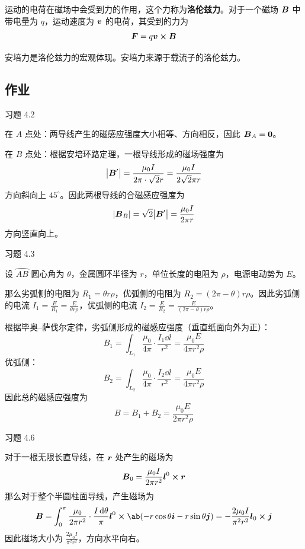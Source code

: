 \begin{definition}[洛伦兹力]
	运动的电荷在磁场中会受到力的作用，这个力称为\textbf{洛伦兹力}。对于一个磁场 $\boldsymbol{B}$ 中带电量为 $q$，运动速度为 $\boldsymbol{v}$ 的电荷，其受到的力为
	$$
	\vect{F} = q \vect{v} \cp \vect{B}
	$$
\end{definition}

安培力是洛伦兹力的宏观体现。安培力来源于载流子的洛伦兹力。

\subsection{作业}

\begin{problem}
	习题 4.2
	\begin{solution}
		在 $A$ 点处：两导线产生的磁感应强度大小相等、方向相反，因此 $\boldsymbol{B}_A = \boldsymbol{0}$。

		在 $B$ 点处：根据安培环路定理，一根导线形成的磁场强度为
		$$
		\abs{\boldsymbol{B}'} = \frac{\mu_0 I}{2 \pi \cdot \sqrt{2} r} = \frac{\mu_0 I}{2 \sqrt{2} \pi r}
		$$
		方向斜向上 $45^{\circ}$。因此两根导线的合磁感应强度为
		$$
		\abs{\boldsymbol{B}_B} = \sqrt{2} \abs{\boldsymbol{B}'} = \frac{\mu_0 I}{2 \pi r}
		$$
		方向竖直向上。
	\end{solution}
\end{problem}

\begin{problem}
	习题 4.3
	\begin{solution}
		设 $\wideparen{AB}$ 圆心角为 $\theta$，金属圆环半径为 $r$，单位长度的电阻为 $\rho$，电源电动势为 $E$。

		那么劣弧侧的电阻为 $R_1 = \theta r \rho$，优弧侧的电阻为 $R_2 = (2\pi - \theta) r \rho$。因此劣弧侧的电流 $I_1 = \frac{E}{R_1} = \frac{E}{\theta r \rho}$，优弧侧的电流 $I_2 = \frac{E}{R_2} = \frac{E}{(2\pi - \theta) r \rho}$。

		根据毕奥--萨伐尔定律，劣弧侧形成的磁感应强度（垂直纸面向外为正）：
		$$
		B_1 = \int_{L_1} \frac{\mu_0}{4\pi} \cdot \frac{I_1 \dd{l}}{r^2} = \frac{\mu_0 E}{4 \pi r^2 \rho}
		$$
		优弧侧：
		$$
		B_2 = \int_{L_2} \frac{\mu_0}{4\pi} \cdot \frac{I_2 \dd{l}}{r^2} = \frac{\mu_0 E}{4 \pi r^2 \rho}
		$$
		因此总的磁感应强度为
		$$
		B = B_1 + B_2 = \frac{\mu_0 E}{2 \pi r^2 \rho}
		$$
	\end{solution}
\end{problem}

\begin{problem}
	习题 4.6
	\begin{solution}
		对于一根无限长直导线，在 $\boldsymbol{r}$ 处产生的磁场为
		$$
		\vect{B}_0 = \frac{\mu_0 I}{2 \pi r^2} \vect{l}^0 \cp \vect{r}
		$$
		那么对于整个半圆柱面导线，产生磁场为
		$$
		\vect{B} = \int_{0}^{\pi} \frac{\mu_0}{2 \pi r^2} \cdot \frac{I \dd{\theta}}{\pi} \vect{l}^{0} \cp \ab(-r \cos \theta \vect{i} - r \sin \theta \vect{j}) = -\frac{2 \mu_0 I}{\pi^2 r^2} \vect{l}_0 \cp \vect{j}
		$$
		因此磁场大小为 $\frac{2 \mu_0 I}{\pi^2 r^2}$，方向水平向右。
	\end{solution}
\end{problem}

